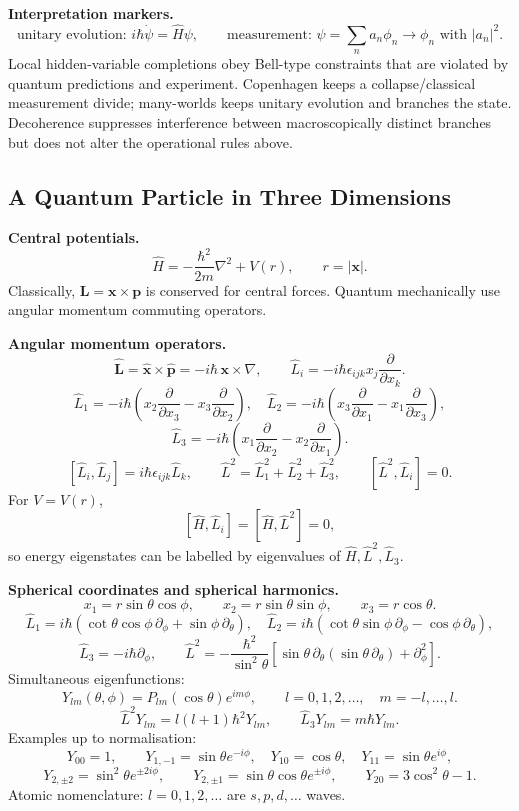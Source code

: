\noindent\textbf{Interpretation markers.}
\[
\text{unitary evolution: } i\hbar\dot\psi=\hat H\psi,\qquad
\text{measurement: } \psi=\sum_n a_n\phi_n\to\phi_n\text{ with }|a_n|^2.
\]
Local hidden-variable completions obey Bell-type constraints that are violated
by quantum predictions and experiment. Copenhagen keeps a collapse/classical
measurement divide; many-worlds keeps unitary evolution and branches the
state. Decoherence suppresses interference between macroscopically distinct
branches but does not alter the operational rules above.

\subsection{A Quantum Particle in Three Dimensions}

\noindent\textbf{Central potentials.}
\[
\hat H=-\frac{\hbar^2}{2m}\nabla^2+V(r),\qquad r=|\mathbf{x}|.
\]
Classically, \(\mathbf{L}=\mathbf{x}\times\mathbf{p}\) is conserved for central
forces. Quantum mechanically use angular momentum commuting operators.

\noindent\textbf{Angular momentum operators.}
\[
\hat{\mathbf{L}}=\hat{\mathbf{x}}\times\hat{\mathbf{p}}
=-i\hbar\,\mathbf{x}\times\nabla,\qquad
\hat L_i=-i\hbar\epsilon_{ijk}x_j\frac{\partial}{\partial x_k}.
\]
\[
\hat L_1=-i\hbar\left(x_2\frac{\partial}{\partial x_3}
-x_3\frac{\partial}{\partial x_2}\right),\quad
\hat L_2=-i\hbar\left(x_3\frac{\partial}{\partial x_1}
-x_1\frac{\partial}{\partial x_3}\right),
\]
\[
\hat L_3=-i\hbar\left(x_1\frac{\partial}{\partial x_2}
-x_2\frac{\partial}{\partial x_1}\right).
\]
\[
\boxed{[\hat L_i,\hat L_j]=i\hbar\epsilon_{ijk}\hat L_k},\qquad
\hat L^2=\hat L_1^2+\hat L_2^2+\hat L_3^2,\qquad
\boxed{[\hat L^2,\hat L_i]=0}.
\]
For \(V=V(r)\),
\[
[\hat H,\hat L_i]=[\hat H,\hat L^2]=0,
\]
so energy eigenstates can be labelled by eigenvalues of
\(\hat H,\hat L^2,\hat L_3\).

\noindent\textbf{Spherical coordinates and spherical harmonics.}
\[
x_1=r\sin\theta\cos\phi,\qquad
x_2=r\sin\theta\sin\phi,\qquad
x_3=r\cos\theta.
\]
\[
\hat L_1=i\hbar\left(\cot\theta\cos\phi\,\partial_\phi+\sin\phi\,\partial_\theta\right),
\quad
\hat L_2=i\hbar\left(\cot\theta\sin\phi\,\partial_\phi-\cos\phi\,\partial_\theta\right),
\]
\[
\hat L_3=-i\hbar\partial_\phi,\qquad
\hat L^2=-\frac{\hbar^2}{\sin^2\theta}
\left[\sin\theta\,\partial_\theta(\sin\theta\,\partial_\theta)+\partial_\phi^2\right].
\]
Simultaneous eigenfunctions:
\[
Y_{l m}(\theta,\phi)=P_{l m}(\cos\theta)e^{im\phi},\qquad
l=0,1,2,\ldots,\quad m=-l,\ldots,l.
\]
\[
\boxed{\hat L^2Y_{lm}=l(l+1)\hbar^2Y_{lm}},\qquad
\boxed{\hat L_3Y_{lm}=m\hbar Y_{lm}}.
\]
Examples up to normalisation:
\[
Y_{00}=1,\qquad
Y_{1,-1}=\sin\theta e^{-i\phi},\quad
Y_{10}=\cos\theta,\quad
Y_{11}=\sin\theta e^{i\phi},
\]
\[
Y_{2,\pm2}=\sin^2\theta e^{\pm2i\phi},\qquad
Y_{2,\pm1}=\sin\theta\cos\theta e^{\pm i\phi},\qquad
Y_{20}=3\cos^2\theta-1.
\]
Atomic nomenclature: \(l=0,1,2,\ldots\) are \(s,p,d,\ldots\) waves.

